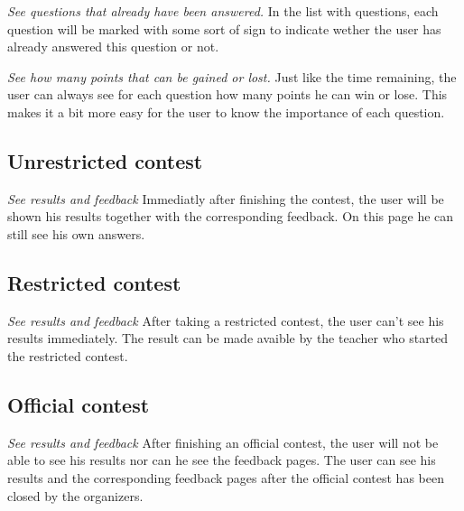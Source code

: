 \textit{See questions that already have been answered.} 
In the list with questions, each question will be marked with some sort of sign to indicate wether the user has already answered this question or not. 

\textit{See how many points that can be gained or lost.}
Just like the time remaining, the user can always see for each question how many points he can win or lose. This makes it a bit more easy for the user to know the importance of each question. 

\subsection*{Unrestricted contest}

\textit{See results and feedback}
Immediatly after finishing the contest, the user will be shown his results together with the corresponding feedback. On this page he can still see his own answers. 

\subsection*{Restricted contest}

\textit{See results and feedback}
After taking a restricted contest, the user can't see his results immediately. The result can be made avaible by the teacher who started the restricted contest. 

\subsection*{Official contest}

\textit{See results and feedback}
After finishing an official contest, the user will not be able to see his results nor can he see the feedback pages. The user can see his results and the corresponding feedback pages after the official contest has been closed by the organizers. 

